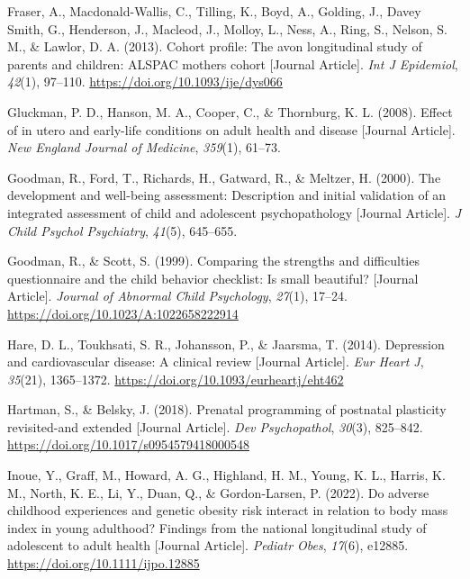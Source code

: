 \documentclass[
  letterpaper,
  DIV=11,
  numbers=noendperiod]{scrreport}
\newlength{\cslhangindent}
\newenvironment{CSLReferences}[2] %
 {\begin{list}{}{%
  \setlength{\itemindent}{0pt}
  \setlength{\leftmargin}{0pt}
  \setlength{\parsep}{0pt}
  \ifodd #1
   \setlength{\leftmargin}{\cslhangindent}
   \setlength{\itemindent}{-1\cslhangindent}
  \fi
  \setlength{\itemsep}{#2\baselineskip}}}
 {\end{list}}
\begin{document}
\begin{CSLReferences}{1}{0}
Fraser, A., Macdonald-Wallis, C., Tilling, K., Boyd, A., Golding, J.,
Davey Smith, G., Henderson, J., Macleod, J., Molloy, L., Ness, A., Ring,
S., Nelson, S. M., \& Lawlor, D. A. (2013). Cohort profile: The avon
longitudinal study of parents and children: ALSPAC mothers cohort
{[}Journal Article{]}. \emph{Int J Epidemiol}, \emph{42}(1), 97--110.
\url{https://doi.org/10.1093/ije/dys066}

Gluckman, P. D., Hanson, M. A., Cooper, C., \& Thornburg, K. L. (2008).
Effect of in utero and early-life conditions on adult health and disease
{[}Journal Article{]}. \emph{New England Journal of Medicine},
\emph{359}(1), 61--73.

Goodman, R., Ford, T., Richards, H., Gatward, R., \& Meltzer, H. (2000).
The development and well-being assessment: Description and initial
validation of an integrated assessment of child and adolescent
psychopathology {[}Journal Article{]}. \emph{J Child Psychol
Psychiatry}, \emph{41}(5), 645--655.

Goodman, R., \& Scott, S. (1999). Comparing the strengths and
difficulties questionnaire and the child behavior checklist: Is small
beautiful? {[}Journal Article{]}. \emph{Journal of Abnormal Child
Psychology}, \emph{27}(1), 17--24.
\url{https://doi.org/10.1023/A:1022658222914}

Hare, D. L., Toukhsati, S. R., Johansson, P., \& Jaarsma, T. (2014).
Depression and cardiovascular disease: A clinical review {[}Journal
Article{]}. \emph{Eur Heart J}, \emph{35}(21), 1365--1372.
\url{https://doi.org/10.1093/eurheartj/eht462}

Hartman, S., \& Belsky, J. (2018). Prenatal programming of postnatal
plasticity revisited-and extended {[}Journal Article{]}. \emph{Dev
Psychopathol}, \emph{30}(3), 825--842.
\url{https://doi.org/10.1017/s0954579418000548}

Inoue, Y., Graff, M., Howard, A. G., Highland, H. M., Young, K. L.,
Harris, K. M., North, K. E., Li, Y., Duan, Q., \& Gordon-Larsen, P.
(2022). Do adverse childhood experiences and genetic obesity risk
interact in relation to body mass index in young adulthood? Findings
from the national longitudinal study of adolescent to adult health
{[}Journal Article{]}. \emph{Pediatr Obes}, \emph{17}(6), e12885.
\url{https://doi.org/10.1111/ijpo.12885}


\end{CSLReferences}
\end{document}
